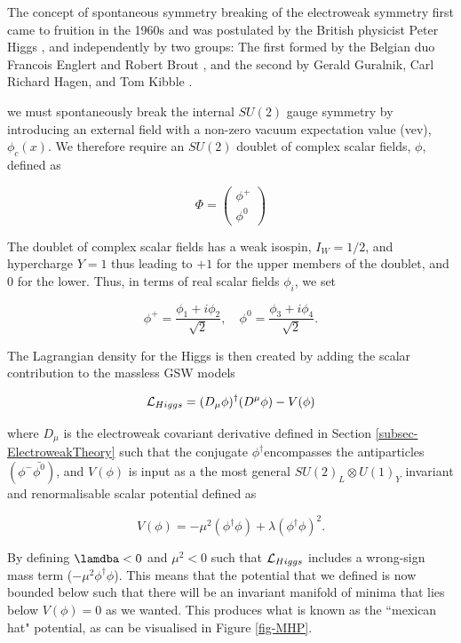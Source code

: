 The concept of spontaneous symmetry breaking of the electroweak symmetry first came to fruition in the 1960s and was postulated by the British physicist Peter Higgs \cite{PhysRevLett.13.508}, and independently by two groups: The first formed by the Belgian duo Francois Englert and Robert Brout \cite{PhysRevLett.13.321}, and the second by Gerald Guralnik, Carl Richard Hagen, and Tom Kibble \cite{PhysRevLett.13.585}.

we must spontaneously break the internal $SU(2)$ gauge symmetry by introducing an external field with a non-zero vacuum expectation value (vev), $\phi_c(x)$. We therefore require an $SU(2)$ doublet of complex scalar fields, $\phi$, defined as

\begin{equation}
\Phi
= 
\begin{pmatrix}
\phi^+ \\
\phi^0
\end{pmatrix}
\end{equation}

The doublet of complex scalar fields has a weak isospin, $I_W = 1/2$, and hypercharge $Y = 1$ thus leading to $+1$ for the upper members of the doublet, and 0 for the lower. Thus, in terms of real scalar fields $\phi_i$, we set

\begin{equation}
\phi^+ = \frac{\phi_1 + i \phi_2}{\sqrt{2}}, \quad \phi^0 = \frac{\phi_3 + i\phi_4}{\sqrt{2}}.
\end{equation}

The Lagrangian density for the Higgs is then created by adding the scalar contribution to the massless GSW models

\begin{equation}
\mathcal{L}_{Higgs} = (D_{\mu}\phi)^{\dagger}(D^{\mu}\phi) - V(\phi)
\end{equation}

where $D_{\mu}$ is the electroweak covariant derivative defined in Section \ref{subsec-ElectroweakTheory} such that the conjugate $\phi^{\dagger}$encompasses the antiparticles $(\phi^-\bar{\phi^0})$, and $V(\phi)$ is input as a the most general $SU(2)_L \otimes U(1)_Y$ invariant and renormalisable scalar potential defined as

\begin{equation}
V(\phi) = -\mu^2(\phi^{\dagger}\phi) + \lambda(\phi^{\dagger}\phi)^2.
\end{equation}

By defining $\lamdba < 0$ and $\mu^2 < 0$ such that $\mathcal{L}_{Higgs}$ includes a wrong-sign mass term ($-\mu^2\phi^{\dagger}\phi$). This means that the potential that we defined is now bounded below such that there will be an invariant manifold of minima that lies below $V(\phi)=0$ as we wanted. This produces what is known as the ``mexican hat" potential, as can be visualised in Figure \ref{fig-MHP}.

